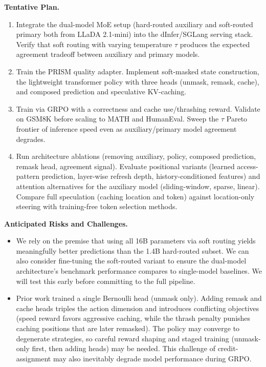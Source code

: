 \documentclass[10pt]{article}
\begin{document}
\textbf{Tentative Plan.}
\begin{enumerate}[leftmargin=*,topsep=0pt]
    \item Integrate the dual-model MoE setup (hard-routed auxiliary and soft-routed primary both from LLaDA 2.1-mini) into the dInfer/SGLang serving stack. Verify that soft routing with varying temperature $\tau$ produces the expected agreement tradeoff between auxiliary and primary models.
    \item Train the PRISM quality adapter. Implement soft-masked state construction, the lightweight transformer policy with three heads (unmask, remask, cache), and composed prediction and speculative KV-caching.
    \item Train via GRPO with a correctness and cache use/thrashing reward. Validate on GSM8K before scaling to MATH and HumanEval. Sweep the $\tau$ Pareto frontier of inference speed even as auxiliary/primary model agreement degrades.
    \item Run architecture ablations (removing auxiliary, policy, composed prediction, remask head, agreement signal). Evaluate positional variants (learned access-pattern prediction, layer-wise refresh depth, history-conditioned features) and attention alternatives for the auxiliary model (sliding-window, sparse, linear). Compare full speculation (caching location and token) against location-only steering with training-free token selection methods.
\end{enumerate}

\textbf{Anticipated Risks and Challenges.}

\begin{itemize}[leftmargin=*, topsep=0pt]
    \item We rely on the premise that using all 16B parameters via soft routing yields meaningfully better predictions than the 1.4B hard-routed subset. We can also consider fine-tuning the soft-routed variant to ensure the dual-model architecture's benchmark performance compares to single-model baselines. We will test this early before committing to the full pipeline.
    \item Prior work trained a single Bernoulli head (unmask only). Adding remask and cache heads triples the action dimension and introduces conflicting objectives (speed reward favors aggressive caching, while the thrash penalty punishes caching positions that are later remasked). The policy may converge to degenerate strategies, so careful reward shaping and staged training (unmask-only first, then adding heads) may be needed. This challenge of credit-assignment may also inevitably degrade model performance during GRPO.
\end{itemize}
\end{document}
